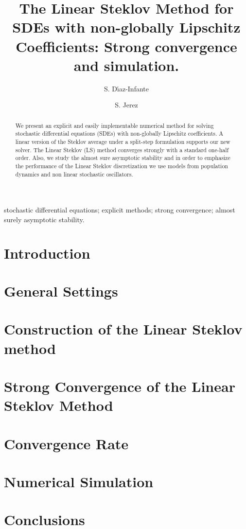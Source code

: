 \documentclass[sort&compress, preprint]{elsarticle}
\theoremstyle{definition}
\theoremstyle{plain}%
\theoremstyle{remark}
\newcommand{\SM}{LS\xspace}
\begin{document}
	\begin{frontmatter}
		\title{
				The Linear Steklov Method
				for SDEs with 
				non-globally Lipschitz Coefficients: Strong convergence and simulation.
		}%
		\author[sj]{S. D\'{\i}az-Infante}
		\author[sj]{S. Jerez}
		\address[sj]{Split Step Linear Steklov Method 
		Department of Applied Mathematics, CIMAT, Guanajuato, Gto., Mexico,
		36240.
		}
	\begin{abstract}
		We present an explicit and easily implementable numerical method for
		solving stochastic differential equations (SDEs) with non-globally Lipschitz
		coefficients. A linear version of the Steklov average under a split-step formulation supports our new solver.
		The Linear Steklov (\SM) method converges strongly with a standard 
		one-half order.  Also, we study the almost sure asymptotic stability and in  order to emphasize the 
		performance of the Linear Steklov discretization we use models from population dynamics 
		and non linear stochastic oscillators.
	\end{abstract}
	\begin{keyword}
		stochastic differential equations;
		explicit methods; strong convergence; almost surely asymptotic stability.
	\end{keyword}
\end{frontmatter}
	\section{Introduction} 
		
	\section{General Settings}
		
	\section{Construction of the Linear Steklov method} 
		
	\section{Strong Convergence of the Linear Steklov Method} 
		
	\section{Convergence Rate} 
		
	\section{Numerical Simulation}
		
	\section{Conclusions}
		
	\section*{\refname}
	
	
\end{document}
